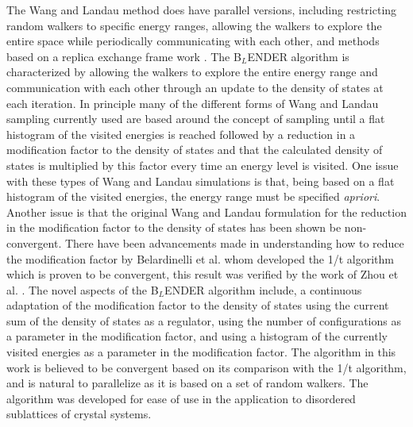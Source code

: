 \documentclass[aps,pre,reprint,superscriptaddress,showkeys]{revtex4-1}
\begin{document}
    The Wang and Landau method does have parallel versions, including  restricting random walkers to specific energy ranges, allowing the walkers to explore the entire space while periodically communicating with each other, and methods based on a replica exchange frame work \cite{MP_Wang_Landau,P_imp_Wang_Landau, Hframe_Wang_Landau, Scalable_replica_exchange}.  The B$_{L}$ENDER algorithm is characterized by allowing the walkers to explore the entire energy range and communication with each other through an update to the density of states at each iteration.  In principle many of the different forms of  Wang and Landau sampling currently used are based around the concept of sampling until a flat histogram of the visited energies is reached followed by a reduction in a modification factor to the density of states and that the calculated density of states  is multiplied by this factor every time an energy level  is visited.  One issue with these types of Wang and Landau simulations is that, being based on a flat histogram of the visited energies, the energy range must be specified \textit{apriori}. Another issue is that the original Wang and Landau formulation for the reduction in the modification factor to the  density of states has been shown be non-convergent\cite{Non_convergent_WL,Non_convergent_WL_2,non_convergence_multiple_random_walkers,Optimal_modification}.   There have been advancements made in understanding how to reduce the modification factor by Belardinelli et al. \cite{saturation} whom developed the 1/t algorithm which is proven to be convergent, this result was verified by the work of Zhou et al. \cite{Optimal_modification}. The novel aspects of the B$_{L}$ENDER algorithm include, a continuous adaptation of the modification factor to the  density of states using the current sum of the density of states as a regulator, using the number of configurations as a parameter in the modification factor, and using a histogram of the currently visited energies as a parameter in the modification factor.  The algorithm in this work is believed to be convergent based on its comparison with the 1/t algorithm, and is natural to parallelize as it is based on a set of random walkers. The algorithm was developed for ease of use in the application to disordered sublattices of crystal systems. 
\end{document}
